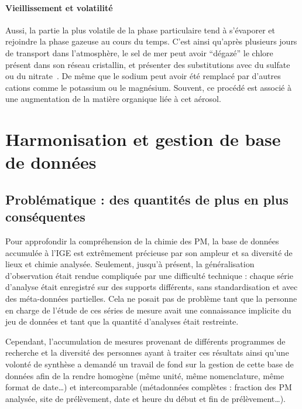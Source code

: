 \paragraph{Vieillissement et volatilité}%
\label{par:vieillissement_et_volatilité}

Aussi, la partie la plus volatile de la phase particulaire tend à s'évaporer et rejoindre
la phase gazeuse au cours du temps. C'est ainsi qu'après plusieurs jours de transport
dans l'atmosphère, le sel de mer peut avoir ``dégazé'' le chlore présent dans son réseau
cristallin, et présenter des substitutions avec du sulfate ou du
nitrate~\parencite{chiSea2015}. De même que le
sodium peut avoir été remplacé par d'autres cations comme le potassium ou le magnésium.
Souvent, ce procédé est associé à une augmentation de la matière organique liée à cet
aérosol.


\section{Harmonisation et gestion de base de données}%
\label{sec:harmonisation_et_gestion_de_base_de_donnée}

\subsection{Problématique : des quantités de plus en plus conséquentes}%
\label{sub:problématisation_des_quantités_de_plus_en_plus_conséquentes}

Pour approfondir la compréhension de la chimie des PM, la base de données accumulée à l'IGE
est extrêmement précieuse par son ampleur et sa diversité de lieux et chimie analysée.
Seulement, jusqu'à présent, la généralisation d'observation était rendue compliquée par une
difficulté technique : chaque série d'analyse était enregistré sur des supports différents,
sans standardisation et avec des méta-données partielles. Cela ne posait pas de problème
tant que la personne en charge de l'étude de ces séries de mesure avait une connaissance
implicite du jeu de données et tant que la quantité d'analyses était restreinte.

Cependant, l'accumulation de mesures provenant de différents programmes de recherche et la
diversité des personnes ayant à traiter ces résultats ainsi qu'une volonté de synthèse
a demandé un travail de fond sur la gestion de cette base de données afin de la rendre 
homogène (même unité, même nomenclature, même format de date…) et intercomparable
(métadonnées complètes : fraction des PM analysée, site de prélèvement, date et heure du
début et fin de prélèvement…).

